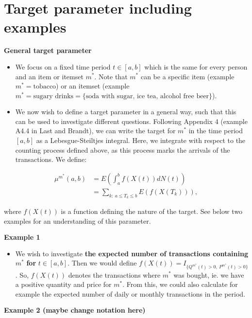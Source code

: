 \documentclass[
  11pt,
]{article}
\providecommand{\tightlist}{%
  \setlength{\itemsep}{0pt}\setlength{\parskip}{0pt}}
\begin{document}
\hypertarget{target-parameter-including-examples}{%
\section{Target parameter including
examples}\label{target-parameter-including-examples}}

\textbf{General target parameter}

\begin{itemize}
\tightlist
\item
  We focus on a fixed time period \(t \in [a,b]\) which is the same for
  every person and an item or itemset \(m^*\). Note that \(m^*\) can be
  a specific item (example \(m^*=\text{tobacco}\)) or an itemset
  (example
  \(m^*=\text{sugary drinks} = \{\text{soda with sugar, ice tea, alcohol free beer}\}\)).
\item
  We now wish to define a target parameter in a general way, such that
  this can be used to investigate different questions. Following
  Appendix 4 (example A4.4 in Last and Brandt), we can write the target
  for \(m^*\) in the time period \([a,b]\) as a Lebesgue-Steiltjes
  integral. Here, we integrate with respect to the counting process
  defined above, as this process marks the arrivals of the transactions.
  We define:
\end{itemize}

\begin{align*}
\mu^{m^*}(a, b) &= E(\int_a^b f(X(t)) dN(t))\\ 
&= \sum_{k: \ a \leq T_k \leq b} E(f(X(T_k))),
\end{align*}

where \(f(X(t))\) is a function defining the nature of the target. See
below two examples for an understanding of this parameter.

\textbf{Example 1}

\begin{itemize}
\tightlist
\item
  We wish to investigate \textbf{the expected number of transactions
  containing} \(m^*\) \textbf{for} \(t\in[a,b]\). Then we would define
  \(f(X(t)) = I_{\{Q^{m^*}(t) > 0, \ P^{m^*}(t) > 0 \}}\). So,
  \(f(X(t))\) denotes the transactions where \(m^*\) was bought, ie. we
  have a positive quantity and price for \(m^*\). From this, we could
  also calculate for example the expected number of daily or monthly
  transactions in the period.
\end{itemize}

\textbf{Example 2 (maybe change notation here)}
\end{document}
